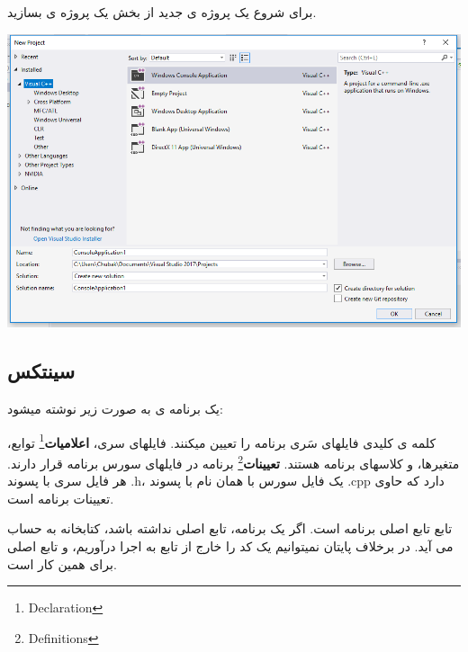 \documentclass[14pt,a4paper]{memoir}
\begin{document}
	 برای شروع یک پروژه ی جدید از بخش  یک پروژه ی  بسازید. 
	 
	 \begin{center}
	 	\includegraphics[scale=0.4]{VSNewProject}
	 \end{center}
	 
	 \subsection{سینتکس}\label{cppsyn}
	 
	 یک برنامه ی  به صورت زیر نوشته میشود:
	 
	 	 	 	 \begin{latin}
	 	
	 \end{latin}
	 
	 کلمه ی کلیدی  فایلهای سَری برنامه را تعیین میکنند. فایلهای سری، \textbf{اعلامیات}\footnote{Declaration} توابع، متغیرها، و کلاسهای برنامه هستند. \textbf{تعیینات}\footnote{Definitions} برنامه در فایلهای سورس برنامه قرار دارند. هر فایل سری با پسوند .h، یک فایل سورس با همان نام با پسوند .cpp دارد که حاوی تعیینات برنامه است. 
	 
	 تابع  تابع اصلی برنامه است. اگر یک برنامه، تابع اصلی نداشته باشد، کتابخانه به حساب می آید. در  برخلاف پایتان نمیتوانیم یک کد را خارج از تابع به اجرا درآوریم، و تابع اصلی برای همین کار است. 
	 
\end{document}
